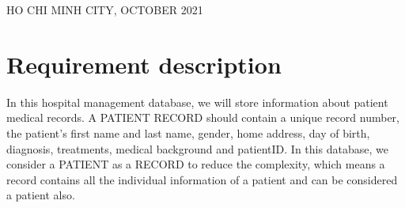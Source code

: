 \documentclass[a4paper]{article}
\numberwithin{equation}{section}
\begin{document}
\begin{titlepage}
  \begin{center}
    {\footnotesize \large HO CHI MINH CITY, OCTOBER 2021}
  \end{center}
\end{titlepage}


\newpage
\tableofcontents
\newpage

\section{Requirement description}
In this hospital management database, we will store information about patient medical records.
A PATIENT RECORD should contain a unique record number, the patient's first name and last name, gender, home address, day of birth, diagnosis, treatments, medical background and patientID\@.
In this database, we consider a PATIENT as a RECORD to reduce the complexity, which means a record contains all the individual information of a patient and can be considered a patient also.
\end{document}
